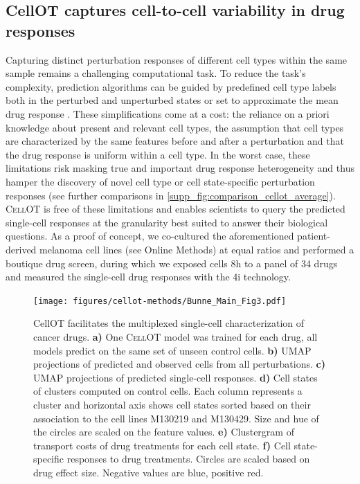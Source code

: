 \subsection{CellOT captures cell-to-cell variability in drug responses}
Capturing distinct perturbation responses of different cell types within the same sample remains a challenging computational task. To reduce the task's complexity, prediction algorithms can be guided by predefined cell type labels both in the perturbed and unperturbed states \cite{chen2020dissecting} or set to approximate the mean drug response \cite{lotfollahi2019scgen}.  These simplifications come at a cost: the reliance on a priori knowledge about present and relevant cell types, the assumption that cell types are characterized by the same features before and after a perturbation and that the drug response is uniform within a cell type.
In the worst case, these limitations risk masking true and important drug response heterogeneity  and thus hamper the discovery of novel cell type or cell state-specific perturbation responses (see further comparisons in \ref{supp_fig:comparison_cellot_average}).
\textsc{CellOT} is free of these limitations and enables scientists to query the predicted single-cell responses at the granularity best suited to answer their biological questions.
As a proof of concept, we co-cultured the aforementioned patient-derived melanoma cell lines (see Online Methods) at equal ratios and performed a boutique drug screen, during which we exposed cells 8h to a panel of 34 drugs and measured the single-cell drug responses with the 4i technology. 

\begin{figure}
  \begin{center}
  \texttt{[image: figures/cellot-methods/Bunne\_Main\_Fig3.pdf]}
  \end{center}
    \caption{CellOT facilitates the multiplexed single-cell characterization of cancer drugs.
    \textbf{a)} One \textsc{CellOT} model was trained for each drug, all models predict on the same set of unseen control cells.
    \textbf{b)} UMAP projections of predicted and observed cells from all perturbations.
    \textbf{c)} UMAP projections of predicted single-cell responses.
    \textbf{d)} Cell states of clusters computed on control cells. Each column represents a cluster and horizontal axis shows cell states sorted based on their association to the cell lines M130219 and M130429. Size and hue of the circles are scaled on the feature values. 
    \textbf{e)} Clustergram of transport costs of drug treatments for each cell state.
    \textbf{f)} Cell state-specific responses to drug treatments. Circles are scaled based on drug effect size. Negative values are blue, positive red.}
  \label{fig:cellot-main-4i-analysis}
\end{figure}


